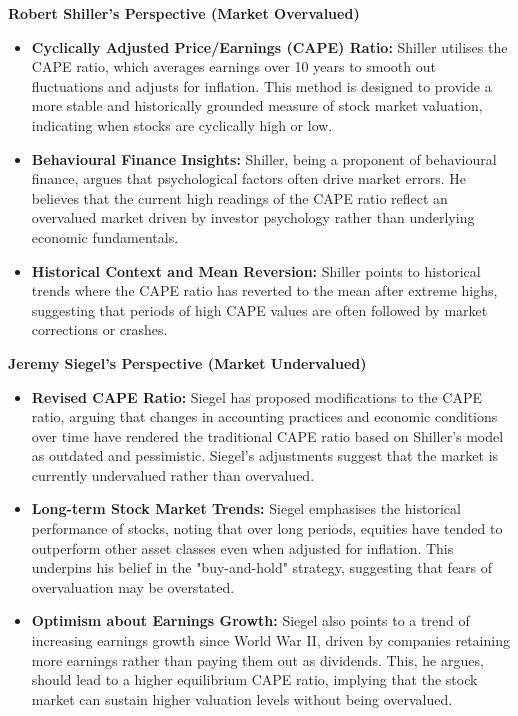 \textbf{Robert Shiller's Perspective (Market Overvalued)}
\begin{itemize}
    \item \textbf{Cyclically Adjusted Price/Earnings (CAPE) Ratio:} Shiller utilises the CAPE ratio, which averages earnings over 10 years to smooth out fluctuations and adjusts for inflation. This method is designed to provide a more stable and historically grounded measure of stock market valuation, indicating when stocks are cyclically high or low.
    \item \textbf{Behavioural Finance Insights:} Shiller, being a proponent of behavioural finance, argues that psychological factors often drive market errors. He believes that the current high readings of the CAPE ratio reflect an overvalued market driven by investor psychology rather than underlying economic fundamentals.
    \item \textbf{Historical Context and Mean Reversion:} Shiller points to historical trends where the CAPE ratio has reverted to the mean after extreme highs, suggesting that periods of high CAPE values are often followed by market corrections or crashes.
\end{itemize}

\textbf{Jeremy Siegel's Perspective (Market Undervalued)}
\begin{itemize}
    \item \textbf{Revised CAPE Ratio:} Siegel has proposed modifications to the CAPE ratio, arguing that changes in accounting practices and economic conditions over time have rendered the traditional CAPE ratio based on Shiller’s model as outdated and pessimistic. Siegel’s adjustments suggest that the market is currently undervalued rather than overvalued.
    \item \textbf{Long-term Stock Market Trends:} Siegel emphasises the historical performance of stocks, noting that over long periods, equities have tended to outperform other asset classes even when adjusted for inflation. This underpins his belief in the "buy-and-hold" strategy, suggesting that fears of overvaluation may be overstated.
    \item \textbf{Optimism about Earnings Growth:} Siegel also points to a trend of increasing earnings growth since World War II, driven by companies retaining more earnings rather than paying them out as dividends. This, he argues, should lead to a higher equilibrium CAPE ratio, implying that the stock market can sustain higher valuation levels without being overvalued.
\end{itemize}

